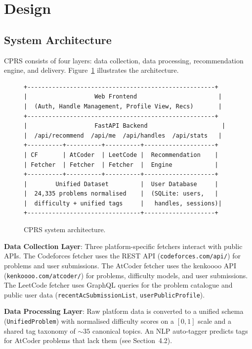 \documentclass[12pt,a4paper]{article}
\begin{document}
\section{Design}

\subsection{System Architecture}

CPRS consists of four layers: data collection, data processing, recommendation engine, and delivery. Figure~\ref{fig:architecture} illustrates the architecture.

\begin{figure}[htbp]
\centering
\begin{verbatim}
+-----------------------------------------------------+
|                   Web Frontend                       |
|  (Auth, Handle Management, Profile View, Recs)       |
+-----------------------------------------------------+
|                   FastAPI Backend                     |
|  /api/recommend  /api/me  /api/handles  /api/stats   |
+----------+----------+----------+--------------------+
| CF       | AtCoder  | LeetCode |  Recommendation    |
| Fetcher  | Fetcher  | Fetcher  |  Engine            |
+----------+----------+----------+--------------------+
|        Unified Dataset         |  User Database     |
|  24,335 problems normalised    |  (SQLite: users,   |
|  difficulty + unified tags     |   handles, sessions)|
+--------------------------------+--------------------+
\end{verbatim}
\caption{CPRS system architecture.}
\label{fig:architecture}
\end{figure}

\textbf{Data Collection Layer}: Three platform-specific fetchers interact with public APIs. The Codeforces fetcher uses the REST API (\texttt{codeforces.com/api/}) for problems and user submissions. The AtCoder fetcher uses the kenkoooo API (\texttt{kenkoooo.com/atcoder/}) for problems, difficulty models, and user submissions. The LeetCode fetcher uses GraphQL queries for the problem catalogue and public user data (\texttt{recentAcSubmissionList}, \texttt{userPublicProfile}).

\textbf{Data Processing Layer}: Raw platform data is converted to a unified schema (\texttt{UnifiedProblem}) with normalised difficulty scores on a $[0, 1]$ scale and a shared tag taxonomy of ${\sim}35$ canonical topics. An NLP auto-tagger predicts tags for AtCoder problems that lack them (see Section~4.2).
\end{document}
